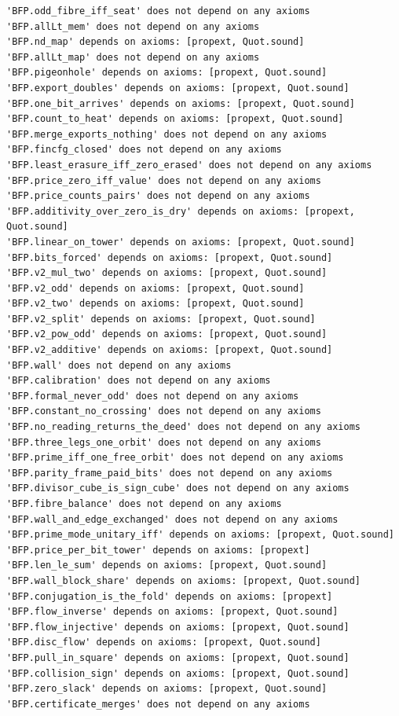 \documentclass[10pt,twocolumn]{article}
\begin{document}
\begin{Verbatim}
'BFP.odd_fibre_iff_seat' does not depend on any axioms
'BFP.allLt_mem' does not depend on any axioms
'BFP.nd_map' depends on axioms: [propext, Quot.sound]
'BFP.allLt_map' does not depend on any axioms
'BFP.pigeonhole' depends on axioms: [propext, Quot.sound]
'BFP.export_doubles' depends on axioms: [propext, Quot.sound]
'BFP.one_bit_arrives' depends on axioms: [propext, Quot.sound]
'BFP.count_to_heat' depends on axioms: [propext, Quot.sound]
'BFP.merge_exports_nothing' does not depend on any axioms
'BFP.fincfg_closed' does not depend on any axioms
'BFP.least_erasure_iff_zero_erased' does not depend on any axioms
'BFP.price_zero_iff_value' does not depend on any axioms
'BFP.price_counts_pairs' does not depend on any axioms
'BFP.additivity_over_zero_is_dry' depends on axioms: [propext, Quot.sound]
'BFP.linear_on_tower' depends on axioms: [propext, Quot.sound]
'BFP.bits_forced' depends on axioms: [propext, Quot.sound]
'BFP.v2_mul_two' depends on axioms: [propext, Quot.sound]
'BFP.v2_odd' depends on axioms: [propext, Quot.sound]
'BFP.v2_two' depends on axioms: [propext, Quot.sound]
'BFP.v2_split' depends on axioms: [propext, Quot.sound]
'BFP.v2_pow_odd' depends on axioms: [propext, Quot.sound]
'BFP.v2_additive' depends on axioms: [propext, Quot.sound]
'BFP.wall' does not depend on any axioms
'BFP.calibration' does not depend on any axioms
'BFP.formal_never_odd' does not depend on any axioms
'BFP.constant_no_crossing' does not depend on any axioms
'BFP.no_reading_returns_the_deed' does not depend on any axioms
'BFP.three_legs_one_orbit' does not depend on any axioms
'BFP.prime_iff_one_free_orbit' does not depend on any axioms
'BFP.parity_frame_paid_bits' does not depend on any axioms
'BFP.divisor_cube_is_sign_cube' does not depend on any axioms
'BFP.fibre_balance' does not depend on any axioms
'BFP.wall_and_edge_exchanged' does not depend on any axioms
'BFP.prime_mode_unitary_iff' depends on axioms: [propext, Quot.sound]
'BFP.price_per_bit_tower' depends on axioms: [propext]
'BFP.len_le_sum' depends on axioms: [propext, Quot.sound]
'BFP.wall_block_share' depends on axioms: [propext, Quot.sound]
'BFP.conjugation_is_the_fold' depends on axioms: [propext]
'BFP.flow_inverse' depends on axioms: [propext, Quot.sound]
'BFP.flow_injective' depends on axioms: [propext, Quot.sound]
'BFP.disc_flow' depends on axioms: [propext, Quot.sound]
'BFP.pull_in_square' depends on axioms: [propext, Quot.sound]
'BFP.collision_sign' depends on axioms: [propext, Quot.sound]
'BFP.zero_slack' depends on axioms: [propext, Quot.sound]
'BFP.certificate_merges' does not depend on any axioms

\end{Verbatim}
\end{document}
